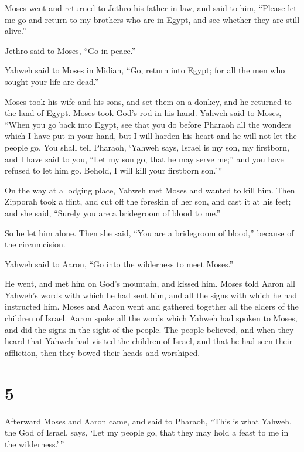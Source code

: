  Moses went and returned to Jethro his father-in-law, and
said to him, ``Please let me go and return to my brothers who are in
Egypt, and see whether they are still alive.''

Jethro said to Moses, ``Go in peace.''

 Yahweh said to Moses in Midian, ``Go, return into Egypt;
for all the men who sought your life are dead.''

 Moses took his wife and his sons, and set them on a
donkey, and he returned to the land of Egypt. Moses took God's rod in
his hand.  Yahweh said to Moses, ``When you go back into
Egypt, see that you do before Pharaoh all the wonders which I have put
in your hand, but I will harden his heart and he will not let the people
go.  You shall tell Pharaoh, `Yahweh says, Israel is my
son, my firstborn,  and I have said to you, ``Let my son
go, that he may serve me;'' and you have refused to let him go. Behold,
I will kill your firstborn son.'\,''

 On the way at a lodging place, Yahweh met Moses and
wanted to kill him.  Then Zipporah took a flint, and cut
off the foreskin of her son, and cast it at his feet; and she said,
``Surely you are a bridegroom of blood to me.''

 So he let him alone. Then she said, ``You are a
bridegroom of blood,'' because of the circumcision.

 Yahweh said to Aaron, ``Go into the wilderness to meet
Moses.''

He went, and met him on God's mountain, and kissed him. 
Moses told Aaron all Yahweh's words with which he had sent him, and all
the signs with which he had instructed him.  Moses and
Aaron went and gathered together all the elders of the children of
Israel.  Aaron spoke all the words which Yahweh had
spoken to Moses, and did the signs in the sight of the people.
 The people believed, and when they heard that Yahweh had
visited the children of Israel, and that he had seen their affliction,
then they bowed their heads and worshiped.

\hypertarget{section-4}{%
\section{5}\label{section-4}}

 Afterward Moses and Aaron came, and said to Pharaoh,
``This is what Yahweh, the God of Israel, says, `Let my people go, that
they may hold a feast to me in the wilderness.'\,''

